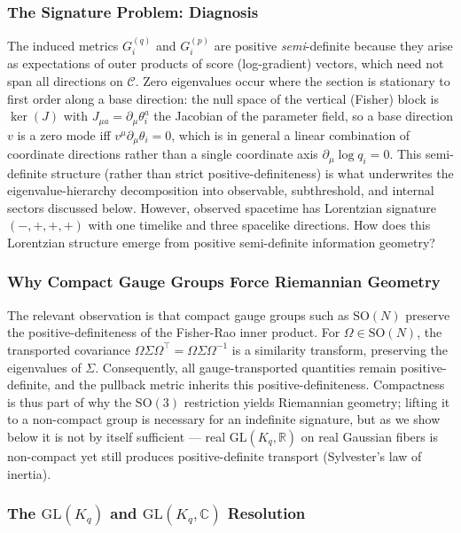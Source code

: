 \documentclass[11pt]{article}
\begin{document}
\subsubsection{The Signature Problem: Diagnosis}

The induced metrics $G_i^{(q)}$ and $G_i^{(p)}$ are positive \emph{semi}-definite because they arise as expectations of outer products of score (log-gradient) vectors, which need not span all directions on $\mathcal{C}$. Zero eigenvalues occur where the section is stationary to first order along a base direction: the null space of the vertical (Fisher) block is $\ker(J)$ with $J_{\mu a} = \partial_\mu \theta^a_i$ the Jacobian of the parameter field, so a base direction $v$ is a zero mode iff $v^\mu \partial_\mu \theta_i = 0$, which is in general a linear combination of coordinate directions rather than a single coordinate axis $\partial_\mu \log q_i = 0$. This semi-definite structure (rather than strict positive-definiteness) is what underwrites the eigenvalue-hierarchy decomposition into observable, subthreshold, and internal sectors discussed below. However, observed spacetime has Lorentzian signature $(-,+,+,+)$ with one timelike and three spacelike directions. How does this Lorentzian structure emerge from positive semi-definite information geometry?

\subsubsection{Why Compact Gauge Groups Force Riemannian Geometry}

The relevant observation is that compact gauge groups such as $\mathrm{SO}(N)$ preserve the positive-definiteness of the Fisher-Rao inner product. For $\Omega \in \mathrm{SO}(N)$, the transported covariance $\Omega \Sigma \Omega^\top = \Omega \Sigma \Omega^{-1}$ is a similarity transform, preserving the eigenvalues of $\Sigma$. Consequently, all gauge-transported quantities remain positive-definite, and the pullback metric inherits this positive-definiteness. Compactness is thus part of why the $\mathrm{SO}(3)$ restriction yields Riemannian geometry; lifting it to a non-compact group is necessary for an indefinite signature, but as we show below it is not by itself sufficient — real $\mathrm{GL}(K_q, \mathbb{R})$ on real Gaussian fibers is non-compact yet still produces positive-definite transport (Sylvester's law of inertia).

\subsubsection{The $\mathrm{GL}(K_q)$ and $\mathrm{GL}(K_q, \mathbb{C})$ Resolution}
\end{document}
